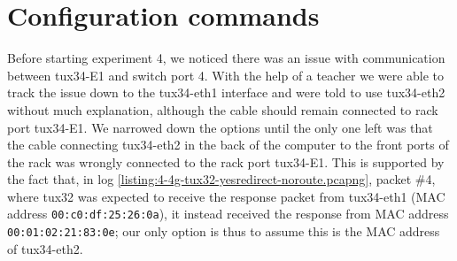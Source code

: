 \documentclass[a4paper, 11pt]{report}
\begin{document}









\restoregeometry

\chapter{Configuration commands} \label{sec:configuration}

Before starting experiment 4, we noticed there was an issue with communication between tux34-E1 and switch port 4.
With the help of a teacher we were able to track the issue down to the tux34-eth1 interface and were told to use tux34-eth2 without much explanation, although the cable should remain connected to rack port tux34-E1.
We narrowed down the options until the only one left was that the cable connecting tux34-eth2 in the back of the computer to the front ports of the rack was wrongly connected to the rack port tux34-E1.
This is supported by the fact that, in log \ref{listing:4-4g-tux32-yesredirect-noroute.pcapng}, packet \#4, where tux32 was expected to receive the response packet from tux34-eth1 (MAC address \texttt{00:c0:df:25:26:0a}), it instead received the response from MAC address \texttt{00:01:02:21:83:0e}; our only option is thus to assume this is the MAC address of tux34-eth2.






\end{document}
